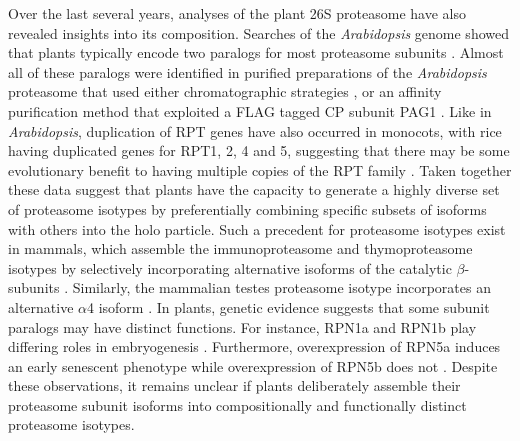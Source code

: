 Over the last several years, analyses of the plant 26S proteasome have also revealed insights into its composition. Searches of the \textit{Arabidopsis} genome showed that plants typically encode two paralogs for most proteasome subunits \citep{fu98}.  Almost all of these paralogs were identified in purified preparations of the \textit{Arabidopsis} proteasome that used either chromatographic strategies \citep{yang04}, or an affinity purification method that exploited a FLAG tagged CP subunit PAG1 \citep{book10}. Like in \textit{Arabidopsis}, duplication of RPT genes have also occurred in monocots, with rice having duplicated genes for RPT1, 2, 4 and 5, suggesting that there may be some evolutionary benefit to having multiple copies of the RPT family \citep{shibahara04}. Taken together these data suggest that plants have the capacity to generate a highly diverse set of proteasome isotypes by preferentially combining specific subsets of isoforms with others into the holo particle.  Such a precedent for proteasome isotypes exist in mammals, which assemble the immunoproteasome and thymoproteasome isotypes by selectively incorporating alternative isoforms of the catalytic $\beta$-subunits \citep{murata07, nandi96}. Similarly, the mammalian testes proteasome isotype incorporates an alternative $\alpha$4 isoform \citep{belote98, uechi14}.  In plants, genetic evidence suggests that some subunit paralogs may have distinct functions. For instance, RPN1a and RPN1b play differing roles in embryogenesis \citep{brukhin05}. Furthermore, overexpression of RPN5a induces an early senescent phenotype while overexpression of RPN5b does not \citep{book09}. Despite these observations, it remains unclear if plants deliberately assemble their proteasome subunit isoforms into compositionally and functionally distinct proteasome isotypes.

